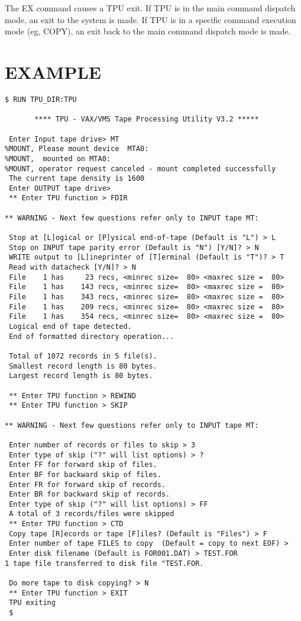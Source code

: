 The EX command causes a TPU exit.
If TPU is in the main command dispatch mode, an exit to the system is made.
If TPU is in a specific command execution mode (eg, COPY), an exit back to the
main command dispatch mode is made.

\pagebreak	%

\section{EXAMPLE}
\begin{verbatim}
$ RUN TPU_DIR:TPU

       **** TPU - VAX/VMS Tape Processing Utility V3.2 *****

 Enter Input tape drive> MT
%MOUNT, Please mount device  MTA0:
%MOUNT,  mounted on MTA0:
%MOUNT, operator request canceled - mount completed successfully
 The current tape density is 1600
 Enter OUTPUT tape drive>
 ** Enter TPU function > FDIR

** WARNING - Next few questions refer only to INPUT tape MT:

 Stop at [L]ogical or [P]ysical end-of-tape (Default is "L") > L
 Stop on INPUT tape parity error (Default is "N") [Y/N]? > N
 WRITE output to [L]ineprinter of [T]erminal (Default is "T")? > T
 Read with datacheck [Y/N]? > N
 File    1 has     23 recs, <minrec size=  80> <maxrec size =  80>
 File    1 has    143 recs, <minrec size=  80> <maxrec size =  80>
 File    1 has    343 recs, <minrec size=  80> <maxrec size =  80>
 File    1 has    209 recs, <minrec size=  80> <maxrec size =  80>
 File    1 has    354 recs, <minrec size=  80> <maxrec size =  80>
 Logical end of tape detected.
 End of formatted directory operation...

 Total of 1072 records in 5 file(s).
 Smallest record length is 80 bytes.
 Largest record length is 80 bytes.

 ** Enter TPU function > REWIND
 ** Enter TPU function > SKIP

** WARNING - Next few questions refer only to INPUT tape MT:

 Enter number of records or files to skip > 3
 Enter type of skip ("?" will list options) > ?
 Enter FF for forward skip of files.
 Enter BF for backward skip of files.
 Enter FR for forward skip of records.
 Enter BR for backward skip of records.
 Enter type of skip ("?" will list options) > FF
 A total of 3 records/files were skipped
 ** Enter TPU function > CTD
 Copy tape [R]ecords or tape [F]iles? (Default is "Files") > F
 Enter number of tape FILES to copy  (Default = copy to next EOF) >
 Enter disk filename (Default is FOR001.DAT) > TEST.FOR
1 tape file transferred to disk file "TEST.FOR.

 Do more tape to disk copying? > N
 ** Enter TPU function > EXIT
 TPU exiting
 $

\end{verbatim}


